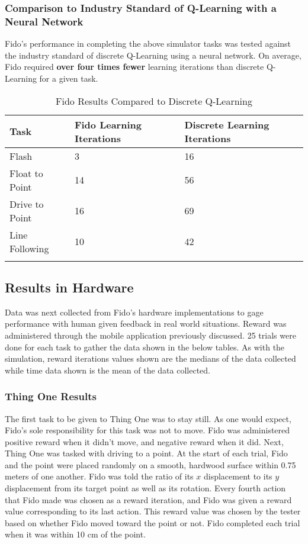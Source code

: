 \subsubsection{Comparison to Industry Standard of Q-Learning with a Neural Network}

Fido's performance in completing the above simulator tasks was tested against the industry standard of discrete Q-Learning using a neural network.  On average, Fido required \textbf{over four times fewer} learning iterations than discrete Q-Learning for a given task.

\begin{table}[ht]
	\centering
	\small
		\begin{tabular}{lYY}
			\toprule
		Task        & Fido Learning Iterations & Discrete Learning Iterations \\ \midrule
			Flash             & 3   & 16  \\
		Float to Point    & 14  & 56  \\
		Drive to Point    & 16  & 69  \\
			Line Following    & 10  & 42 \\
		\caption {Fido Results Compared to Discrete Q-Learning}
			\label{tab:simindustrystandardresults}
	\end{tabular}
\end{table}

\subsection{Results in Hardware}

Data was next collected from Fido's hardware implementations to gage performance with human given feedback in real world situations.
Reward was administered through the mobile application previously discussed.  25 trials were done for each task to gather the data shown in the below tables.  As with the simulation, reward iterations values shown are the medians of the data collected while time data shown is the mean of the data collected.

\subsubsection{Thing One Results}

The first task to be given to Thing One was to stay still.
As one would expect, Fido's sole responsibility for this task was not to move.
Fido was administered positive reward when it didn't move, and negative reward when it did.
Next, Thing One was tasked with driving to a point.
At the start of each trial, Fido and the point were placed randomly on a smooth, hardwood surface within 0.75 meters of one another.
Fido was told the ratio of its $x$ displacement to its $y$ displacement from its target point as well as its rotation.
Every fourth action that Fido made was chosen as a reward iteration, and Fido was given a reward value corresponding to its last action.
This reward value was chosen by the tester based on whether Fido moved toward the point or not.
Fido completed each trial when it was within 10 cm of the point.


